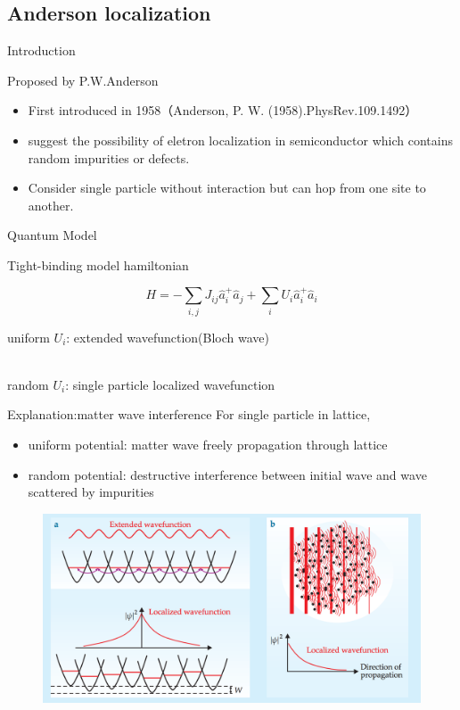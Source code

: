 \documentclass{beamer}
\begin{document}
\subsection{Anderson localization}
\begin{frame}{Introduction}

Proposed by P.W.Anderson 

\begin{itemize}
\item First introduced in 1958（Anderson, P. W. (1958).PhysRev.109.1492）

\item suggest the possibility of eletron localization in semiconductor which contains random impurities or defects.

\item Consider single particle without interaction but can hop from one site to another.

\end{itemize}

\end{frame}

\begin{frame}{Quantum Model}

Tight-binding model hamiltonian

$$H = -\sum_{i,j}J_{ij} \hat{a}^{+}_{i}\hat{a}_{j}+\sum_{i}U_{i}\hat{a}^{+}_{i}\hat{a}_{i}$$

uniform $U_{i}$: extended wavefunction(Bloch wave)\\~


random  $U_{i}$: single particle localized wavefunction

\end{frame}
\begin{frame}{Explanation:matter wave interference}
For single particle in lattice,
\begin{itemize}
\item uniform potential: matter wave freely propagation through lattice
\item random potential: destructive interference between initial wave and wave scattered by impurities
\end{itemize}
\begin{figure}
\includegraphics[width=0.6\linewidth]{AndersonLocalization}
\end{figure}
\end{frame}
\end{document}
